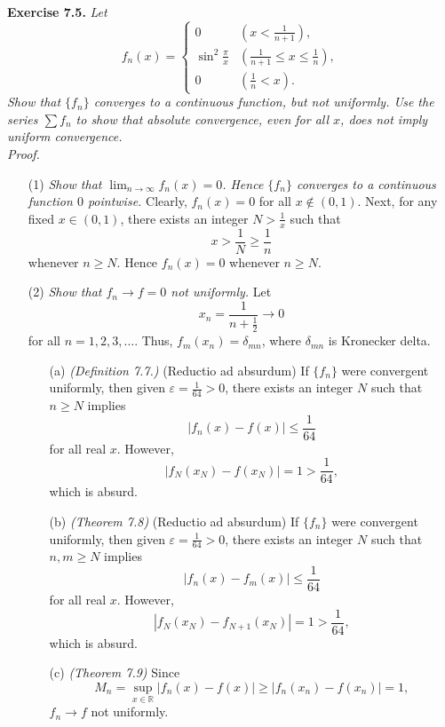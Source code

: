 \documentclass{article}
\begin{document}
\textbf{Exercise 7.5.}
\emph{Let
\begin{equation*}
  f_n(x) =
    \begin{cases}
      0                    & (x < \frac{1}{n+1}), \\
      \sin^2 \frac{\pi}{x} & (\frac{1}{n+1} \leq x \leq \frac{1}{n}), \\
      0                    & (\frac{1}{n} < x).
    \end{cases}
\end{equation*}
Show that $\{f_n\}$ converges to a continuous function, but not uniformly.
Use the series $\sum f_n$ to show that absolute convergence, even for all $x$,
does not imply uniform convergence.} \\

\emph{Proof.}
\begin{enumerate}
\item[(1)]
\emph{Show that $\lim_{n \to \infty} f_n(x) = 0$.
Hence $\{f_n\}$ converges to a continuous function $0$ pointwise.}
Clearly, $f_n(x) = 0$ for all $x \not\in (0,1)$.
Next, for any fixed $x \in (0,1)$, there exists an integer $N > \frac{1}{x}$
such that
\[
  x > \frac{1}{N} \geq \frac{1}{n}
\]
whenever $n \geq N$.
Hence $f_n(x) = 0$ whenever $n \geq N$.

\item[(2)]
\emph{Show that $f_n \to f = 0$ not uniformly.}
Let
\[
  x_n = \frac{1}{n+\frac{1}{2}} \to 0
\]
for all $n=1,2,3,\ldots$.
Thus, $f_m(x_n) = \delta_{mn}$, where $\delta_{mn}$ is Kronecker delta.
  \begin{enumerate}
  \item[(a)]
  \emph{(Definition 7.7.)}
  (Reductio ad absurdum)
  If $\{f_n\}$ were convergent uniformly, then
  given $\varepsilon = \frac{1}{64} > 0$,
  there exists an integer $N$ such that $n \geq N$ implies
  \[
    |f_n(x) - f(x)| \leq \frac{1}{64}
  \]
  for all real $x$.
  However,
  \[
    |f_N(x_N) - f(x_N)| =  1 > \frac{1}{64},
  \]
  which is absurd.

  \item[(b)]
  \emph{(Theorem 7.8)}
  (Reductio ad absurdum)
  If $\{f_n\}$ were convergent uniformly, then
  given $\varepsilon = \frac{1}{64} > 0$,
  there exists an integer $N$ such that $n,m \geq N$ implies
  \[
    |f_n(x) - f_m(x)| \leq \frac{1}{64}
  \]
  for all real $x$.
  However,
  \[
    |f_N(x_{N}) - f_{N+1}(x_{N})| =  1 > \frac{1}{64},
  \]
  which is absurd.

  \item[(c)]
  \emph{(Theorem 7.9)}
  Since
  \[
    M_n
    = \sup_{x \in \mathbb{R}}|f_n(x) - f(x)|
    \geq |f_n(x_n) - f(x_n)| = 1,
  \]
  $f_n \to f$ not uniformly.


\end{enumerate}
\end{enumerate}
\end{document}
